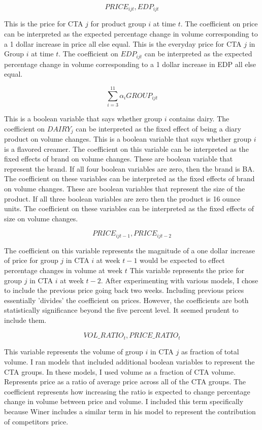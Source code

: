 \documentclass{article}
\begin{document}
$${PRICE}_{ijt}, EDP_{ijt}$$ 

This is the price for CTA $j$ for product group $i$ at time $t$. The coefficient on price can be interpreted as the expected percentage change in volume corresponding to a 1 dollar increase in price all else equal.
This is the everyday price for CTA $j$ in Group $i$ at time $t$. The coefficient on $EDP_{ijt}$ can be interpreted as the expected percentage change in volume corresponding to a 1 dollar increase in EDP all else equal.

$$ \sum_{i=3}^{11} \alpha_i {GROUP}_{ijt} $$ 

This is a boolean variable that says whether group $i$ contains dairy. The coefficient on $DAIRY_{j}$ can be interpreted as the fixed effect of being a diary product on volume changes.
This is a boolean variable that says whether group $i$ is a flavored creamer. The coefficient on this variable can be interpreted as the fixed effects of brand on volume changes.
These are boolean variable that represent the brand. If all four boolean variables are zero, then the brand is BA. The coefficient on these variables can be interpreted as the fixed effects of brand on volume changes.
These are boolean variables that represent the size of the product. If all three boolean variables are zero then the product is 16 ounce units.  The coefficient on these variables can be interpreted as the fixed effects of size on volume changes.

$${PRICE}_{ijt-1}, {PRICE}_{ijt-2} $$

The coefficient on this variable represents the magnitude of a one dollar increase of price for group $j$ in CTA $i$ at week $t-1$ would be expected to effect percentage changes in volume at week $t$
This variable represents the price for group $j$ in CTA $i$ at week $t-2$. After experimenting with various models, I chose to include the previous price going back two weeks. Including previous prices essentially 'divides' the coefficient on prices. However, the coefficients are both statistically significance beyond the five percent level. It seemed prudent to include them.

$${VOL\_RATIO}_t, {PRICE\_RATIO}_{t} $$ 

This variable represents the volume of group $i$ in CTA $j$ as  fraction of total volume. I ran models that included additional boolean variables to represent the CTA groups. In these models, I used volume as a fraction of CTA volume.
Represents price as a ratio of average price across all of the CTA groups. The coefficient represents how increasing the ratio is expected to change percentage change in volume between price and volume.  I included this term specifically because Winer includes a similar term in his model to represent the contribution of competitors price.
\end{document}

